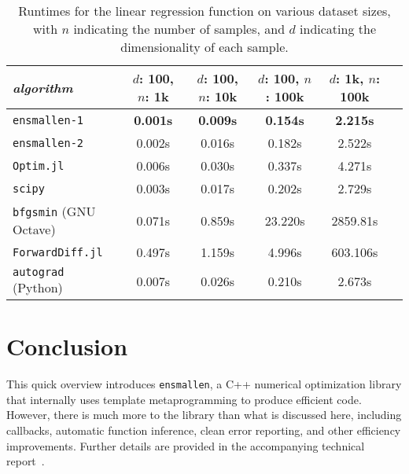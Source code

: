 \documentclass[twoside,11pt]{article}
\begin{document}
\begin{table}[t!]
{\small
\centering
\begin{tabular}{lccccc}
\toprule
{\em algorithm} & $d$: 100, $n$: 1k & $d$: 100, $n$: 10k & $d$: 100, $n$:
100k & $d$: 1k, $n$: 100k \\
\midrule
\texttt{ensmallen-1} & {\bf 0.001s} & {\bf 0.009s} & {\bf 0.154s} & {\bf 2.215s} \\
\texttt{ensmallen-2} & 0.002s & 0.016s & 0.182s & 2.522s \\
\texttt{Optim.jl} & 0.006s & 0.030s & 0.337s & 4.271s \\
\texttt{scipy} & 0.003s & 0.017s & 0.202s & 2.729s \\
\texttt{bfgsmin} (GNU Octave) & 0.071s & 0.859s & 23.220s & 2859.81s\\
\texttt{ForwardDiff.jl} & 0.497s & 1.159s & 4.996s & 603.106s \\
\texttt{autograd} (Python) & 0.007s & 0.026s & 0.210s & 2.673s \\
\bottomrule
\end{tabular}
\vspace*{-0.4em}
\caption{
Runtimes for the linear regression function on various dataset sizes,
with $n$ indicating the number of samples,
and $d$ indicating the dimensionality of each sample.
}
\label{tab:lbfgs}
}
\vspace*{-2.2em}
\end{table}

\section{Conclusion}
\label{sec:conclusion}

This quick overview introduces {\tt ensmallen}, a C++ numerical optimization
library that internally uses template metaprogramming to produce efficient code.
However, there is much more to the library than what is discussed here,
including callbacks, automatic function inference, clean error reporting, and
other efficiency improvements.
Further details are provided in the accompanying technical report~\citep{ensmallen2020}.
\end{document}
